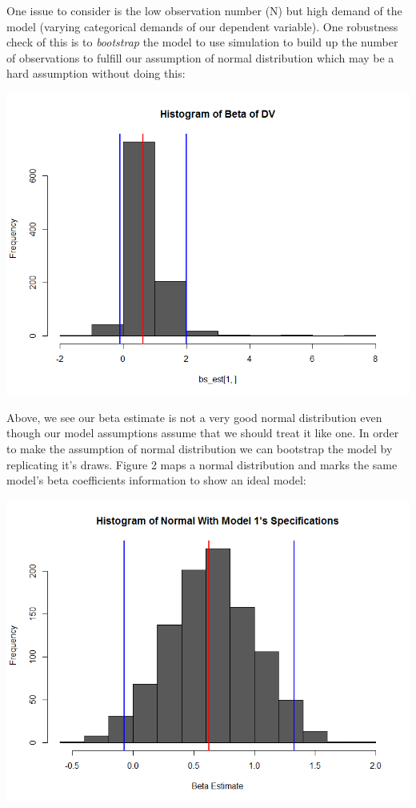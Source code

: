 \documentclass[12pt]{article}\usepackage[]{graphicx}\usepackage[]{color}
\begin{document}
\begin{flushleft}
One issue to consider is the low observation number (N) but high demand of the model (varying categorical demands of our dependent variable). One robustness check of this is to \textit{bootstrap} the model to use simulation to build up the number of observations to fulfill our assumption of normal distribution which may be a hard assumption without doing this:
\begin{center}
\includegraphics[scale=.65]{best}
\end{center}
Above, we see our beta estimate is not a very good normal distribution even though our model assumptions assume that we should treat it like one. In order to make the assumption of normal distribution we can bootstrap the model by replicating it's draws. Figure 2 maps a normal distribution and marks the same model's beta coefficients information to show an ideal model:

\clearpage

\begin{center}
\includegraphics[scale=.6]{Nbest}
\end{center}


\end{flushleft}
\end{document}
